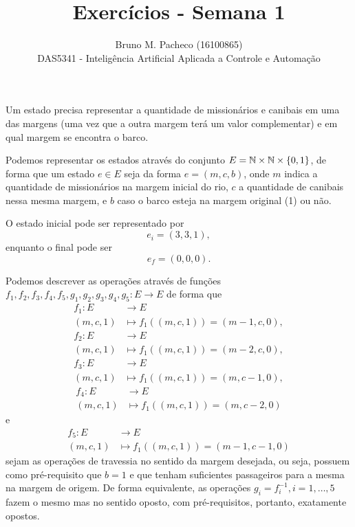\documentclass[a4paper]{report}
\begin{document}
 
\title{Exercícios - Semana 1}
\author{Bruno M. Pacheco (16100865)\\
DAS5341 - Inteligência Artificial Aplicada a Controle e Automação}
 
\maketitle
 


Um estado precisa representar a quantidade de missionários e canibais em uma das margens (uma vez que a outra margem terá um valor complementar) e em qual margem se encontra o barco.

Podemos representar os estados através do conjunto $E = \mathbb{N}\times \mathbb{N}\times \{0,1\} $, de forma que um estado $e\in E$ seja da forma $e = \left( m, c, b \right) $, onde $m$ indica a quantidade de missionários na margem inicial do rio, $c$ a quantidade de canibais nessa mesma margem, e $b$ caso o barco esteja na margem original (1) ou não.


O estado inicial pode ser representado por \[
e_i = \left( 3,3,1 \right) 
,\] enquanto o final pode ser \[
e_f = \left( 0,0,0 \right) 
.\] 


Podemos descrever as operações através de funções $f_1,f_2,f_3,f_4,f_5,g_1,g_2,g_3,g_4,g_5: E \longrightarrow E$ de forma que 
\begin{align*}
    f_1: E &\longrightarrow E \\
    \left( m,c,1 \right)  &\longmapsto f_1(\left( m,c,1 \right) ) = \left( m-1,c,0 \right) 
,\end{align*}
\begin{align*}
    f_2: E &\longrightarrow E \\
    \left( m,c,1 \right)  &\longmapsto f_1(\left( m,c,1 \right) ) = \left( m-2,c,0 \right) 
,\end{align*}
\begin{align*}
    f_3: E &\longrightarrow E \\
    \left( m,c,1 \right)  &\longmapsto f_1(\left( m,c,1 \right) ) = \left( m,c-1,0 \right) 
,\end{align*}
\begin{align*}
    f_4: E &\longrightarrow E \\
    \left( m,c,1 \right)  &\longmapsto f_1(\left( m,c,1 \right) ) = \left( m,c-2,0 \right) 
\end{align*}
e
\begin{align*}
    f_5: E &\longrightarrow E \\
    \left( m,c,1 \right)  &\longmapsto f_1(\left( m,c,1 \right) ) = \left( m-1,c-1,0 \right) 
\end{align*}
sejam as operações de travessia no sentido da margem desejada, ou seja, possuem como pré-requisito que $b=1$ e que tenham suficientes passageiros para a mesma na margem de origem. De forma equivalente, as operações $g_i=f_i^{-1}, i=1,\ldots,5$ fazem o mesmo mas no sentido oposto, com pré-requisitos, portanto, exatamente opostos.
\end{document}

